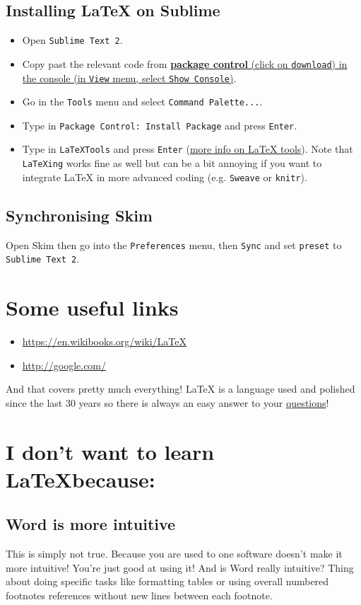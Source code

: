 \documentclass[a4paper,11pt]{article}
\begin{document}
\subsection{Installing LaTeX on Sublime}
\begin{itemize}
\item Open \texttt{Sublime Text 2}.
\item Copy past the relevant code from \href{https://packagecontrol.io/}{\textbf{package control} (click on \texttt{download}) in the console (in \texttt{View} menu, select \texttt{Show Console})}.
\item Go in the \texttt{Tools} menu and select \texttt{Command Palette...}.
\item Type in \texttt{Package Control: Install Package} and press \texttt{Enter}.
\item Type in \texttt{LaTeXTools} and press \texttt{Enter} (\href{https://github.com/SublimeText/LaTeXTools/blob/master/README.markdown}{more info on LaTeX tools}). Note that \texttt{LaTeXing} works fine as well but can be a bit annoying if you want to integrate LaTeX in more advanced coding (e.g. \texttt{Sweave} or \texttt{knitr}).
\end{itemize}

\subsection{Synchronising Skim}
Open Skim then go into the \texttt{Preferences} menu, then \texttt{Sync} and set \texttt{preset} to \texttt{Sublime Text 2}.

\section{Some useful links}
\begin{itemize}
\item \url{https://en.wikibooks.org/wiki/LaTeX}
\item \url{http://google.com/}
\end{itemize}
And that covers pretty much everything!
LaTeX is a language used and polished since the last 30 years so there is always an easy answer to your \href{http://lmgtfy.com/?q=ask+a+question+in+latex}{questions}!

\section{I don't want to learn \LaTeX because:}
\subsection{Word is more intuitive}
This is simply not true.
Because you are used to one software doesn't make it more intuitive!
You're just good at using it!
And is Word really intuitive?
Thing about doing specific tasks like formatting tables or using overall numbered footnotes references without new lines between each footnote.
\end{document}
